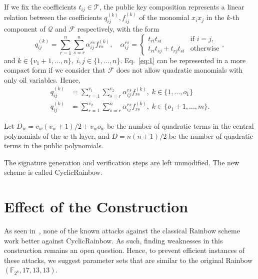 \documentclass[a4paper, 14pt]{extarticle}
\begin{document}
If we fix the coefficients $t_{ij} \in \mathcal{T}$, the public key composition represents a linear relation between the coefficients $q_{ij}^{(k)}, f_{ij}^{(k)}$ of the monomial $x_{i} x_{j}$ in the $k$-th component of $\mathcal{Q}$ and $\mathcal{F}$ respectively, with the form
\begin{equation}\label{eq:1}
q_{ij}^{(k)} = \sum_{r = 1}^{n} \sum_{s = r}^{n} \alpha_{ij}^{rs} f_{rs}^{(k)}, \quad \alpha_{ij}^{rs} =
\begin{cases}
t_{ri} t_{si}                   & \text{if } i = j, \\
t_{ri} t_{sj} + t_{rj} t_{si}   & \text{otherwise}
\end{cases},
\end{equation}
and $k \in \{v_{1} + 1, \dots, n\}, \; i, j \in \{1, \dots, n\}$. Eq.~\ref{eq:1} can be represented in a more compact form if we consider that $\mathcal{F}$ does not allow quadratic monomials with only oil variables. Hence,
\begin{align}
    q_{ij}^{(k)} &= \sum_{r = 1}^{v_{1}} \sum_{s = r}^{v_{2}} \alpha_{ij}^{rs} f_{rs}^{(k)}, \; k \in \{1, \dots, o_{1}\} \\
    q_{ij}^{(k)} &= \sum_{r = 1}^{v_{2}} \sum_{s = r}^{n} \alpha_{ij}^{rs} f_{rs}^{(k)}, \; k \in \{o_{1} + 1, \dots,  m\}.
\end{align}



Let $D_{w} = v_{w}(v_{w} + 1)/2 + v_{w} o_{w}$ be the number of quadratic terms in the central polynomials of the $w$-th layer, and $D = n(n + 1)/2$ be the number of quadratic terms in the public polynomials.

The signature generation and verification steps are left unmodified. The new scheme is called CyclicRainbow.

\section{Effect of the Construction}\label{sec:effect}

As seen in~\cite[Section 9.3]{Petzoldt:phd:2013:jul}, none of the known attacks against the classical Rainbow scheme work better against CyclicRainbow. As such, finding weaknesses in this construction remains an open question. Hence, to prevent efficient instances of these attacks, we suggest parameter sets that are similar to the original Rainbow$(\mathbb{F}_{2^{8}}, 17, 13, 13)$.
\end{document}

